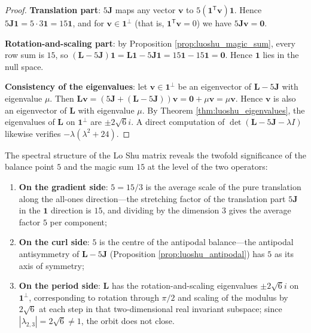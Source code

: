 \begin{proof}
\textbf{Translation part}: $5\mathbf{J}$ maps any vector $\mathbf{v}$ to $5(\mathbf{1}^{\mathsf T}\mathbf{v})\mathbf{1}$. Hence $5\mathbf{J}\mathbf{1} = 5 \cdot 3\mathbf{1} = 15\mathbf{1}$, and for $\mathbf{v} \in \mathbf{1}^\perp$ (that is, $\mathbf{1}^{\mathsf T}\mathbf{v} = 0$) we have $5\mathbf{J}\mathbf{v} = \mathbf{0}$.

\textbf{Rotation-and-scaling part}: by Proposition \ref{prop:luoshu_magic_sum}, every row sum is $15$, so $(\mathbf{L} - 5\mathbf{J})\mathbf{1} = \mathbf{L}\mathbf{1} - 5\mathbf{J}\mathbf{1} = 15\mathbf{1} - 15\mathbf{1} = \mathbf{0}$. Hence $\mathbf{1}$ lies in the null space.

\textbf{Consistency of the eigenvalues}: let $\mathbf{v} \in \mathbf{1}^\perp$ be an eigenvector of $\mathbf{L} - 5\mathbf{J}$ with eigenvalue $\mu$. Then $\mathbf{L}\mathbf{v} = (5\mathbf{J} + (\mathbf{L} - 5\mathbf{J}))\mathbf{v} = \mathbf{0} + \mu\mathbf{v} = \mu\mathbf{v}$. Hence $\mathbf{v}$ is also an eigenvector of $\mathbf{L}$ with eigenvalue $\mu$. By Theorem \ref{thm:luoshu_eigenvalues}, the eigenvalues of $\mathbf{L}$ on $\mathbf{1}^\perp$ are $\pm 2\sqrt{6}i$. A direct computation of $\det(\mathbf{L} - 5\mathbf{J} - \lambda I)$ likewise verifies $-\lambda(\lambda^2 + 24)$.
\end{proof}

\begin{corollary}\label{cor:luoshu_grammar}
The spectral structure of the Lo Shu matrix reveals the twofold significance of the balance point $5$ and the magic sum $15$ at the level of the two operators:
\begin{enumerate}[label=(\roman*)]
    \item \textbf{On the gradient side}: $5 = 15/3$ is the average scale of the pure translation along the all-ones direction---the stretching factor of the translation part $5\mathbf{J}$ in the $\mathbf{1}$ direction is $15$, and dividing by the dimension $3$ gives the average factor $5$ per component;
    \item \textbf{On the curl side}: $5$ is the centre of the antipodal balance---the antipodal antisymmetry of $\mathbf{L} - 5\mathbf{J}$ (Proposition \ref{prop:luoshu_antipodal}) has $5$ as its axis of symmetry;
    \item \textbf{On the period side}: $\mathbf{L}$ has the rotation-and-scaling eigenvalues $\pm 2\sqrt{6}i$ on $\mathbf{1}^\perp$, corresponding to rotation through $\pi/2$ and scaling of the modulus by $2\sqrt{6}$ at each step in that two-dimensional real invariant subspace; since $|\lambda_{2,3}|=2\sqrt{6}\ne1$, the orbit does not close.
\end{enumerate}
\end{corollary}

